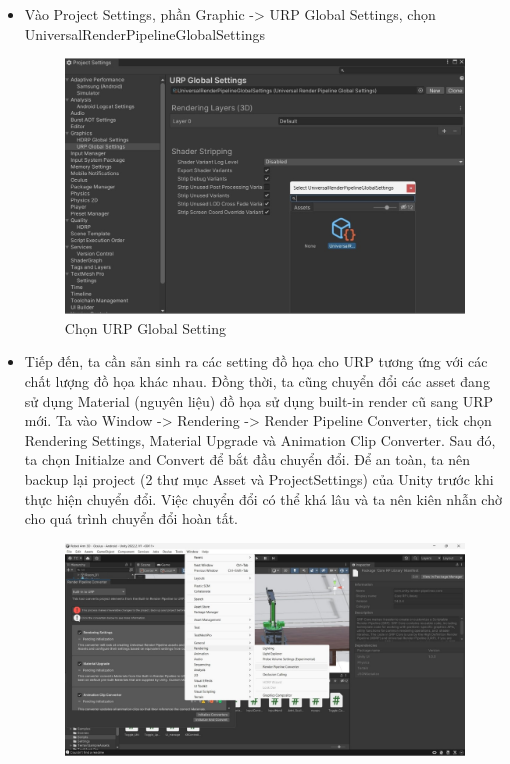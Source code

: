 \begin{itemize}
    \item Vào Project Settings, phần Graphic -> URP Global Settings, chọn UniversalRenderPipelineGlobalSettings
    \begin{figure}[H]
        \centering
        \includegraphics[width=1\textwidth]{Images/Implementation/VRapp/unityrp_0.jpg}
        \caption{Chọn URP Global Setting}
        \label{fig:unityrp_0}
    \end{figure}
    \item Tiếp đến, ta cần sản sinh ra các setting đồ họa cho URP tương ứng với các chất lượng đồ họa khác nhau. Đồng thời, ta cũng chuyển đổi các asset đang sử dụng Material (nguyên liệu) đồ họa sử dụng built-in render cũ sang URP mới. Ta vào Window -> Rendering -> Render Pipeline Converter, tick chọn Rendering Settings, Material Upgrade và Animation Clip Converter. Sau đó, ta chọn Initialze and Convert để bắt đầu chuyển đổi. Để an toàn, ta nên backup lại project (2 thư mục Asset và ProjectSettings) của Unity trước khi thực hiện chuyển đổi. Việc chuyển đổi có thể khá lâu và ta nên kiên nhẫn chờ cho quá trình chuyển đổi hoàn tất.
    \begin{figure}[H]
        \centering
        \includegraphics[width=1\textwidth]{Images/Implementation/VRapp/unityrp_1.jpg}

\end{figure}
\end{itemize}
